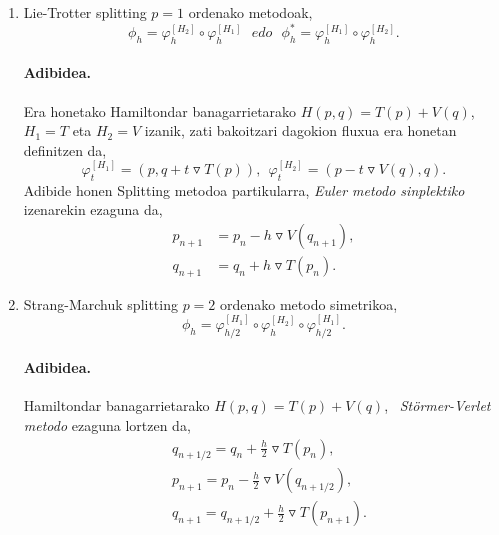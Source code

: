 \begin{enumerate}

\item Lie-Trotter splitting $p=1$ ordenako metodoak,
\begin{equation}
\phi_h = \varphi_h^{[H_2]} \circ \varphi_h^{[H_1]} \ \ \ edo \ \ \ \phi_h^{*} = \varphi_h^{[H_1]} \circ \varphi_h^{[H_2]}.
\label{eq:LieT}
\end{equation}


\paragraph*{Adibidea.}

Era honetako Hamiltondar banagarrietarako $H(p,q)=T(p)+V(q)$, $H_1=T$ eta $H_2=V$ izanik, zati bakoitzari dagokion fluxua era honetan definitzen da,
\begin{equation*}
\varphi_t^{[H_1]}=(p,q+t\triangledown T(p)), \ \ \varphi_t^{[H_2]}=(p-t\triangledown V(q),q). 
\end{equation*}
Adibide honen Splitting metodoa partikularra, \emph{Euler metodo sinplektiko} izenarekin ezaguna da,
\begin{align*}
p_{n+1}&=p_{n}-h \triangledown V(q_{n+1}), \\
q_{n+1}&=q_{n}+h \triangledown T(p_n).
\end{align*}  
   

\item Strang-Marchuk splitting $p=2$ ordenako metodo simetrikoa,
\begin{equation}
\phi_h =  \varphi_{{h}/{2}}^{[H_1]} \circ \varphi_h^{[H_2]} \circ \varphi_{{h}/{2}}^{[H_1]}.
\end{equation} 

\paragraph*{Adibidea.}

Hamiltondar banagarrietarako $H(p,q)=T(p)+V(q)$, ~\emph{Störmer-Verlet metodo} ezaguna lortzen da,
\begin{align*}
&q_{{n+1}/{2}} =q_n+\frac{h}{2} \triangledown T(p_n), \\
&p_{n+1} =p_n-\frac{h}{2} \triangledown V(q_{{n+1}/{2}}), \\
&q_{n+1} =q_{{n+1}/{2}}+\frac{h}{2} \triangledown T(p_{n+1}).
\end{align*}

\end{enumerate}

